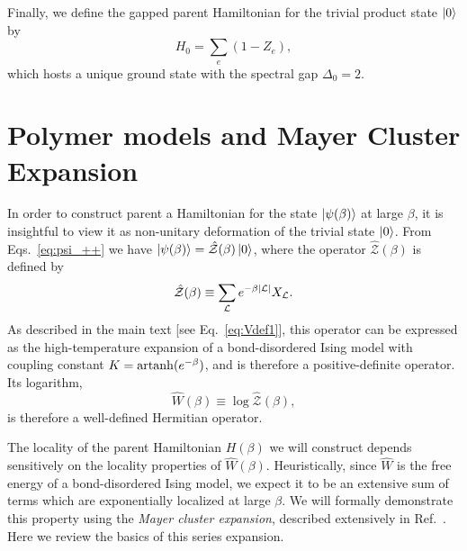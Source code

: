 Finally, we define the gapped parent Hamiltonian for the trivial product state $\ket{0}$ by
\begin{equation}
    H_0 = \sum_e (1 - Z_e) ,
\end{equation}
which hosts a unique ground state with the spectral gap $\Delta_0 = 2$. 

\section{Polymer models and Mayer Cluster Expansion}
\label{sec:cluster_expansion}
In order to construct parent a Hamiltonian for the state $\ket{\psi(\beta)}$ at large $\beta$, it is insightful to view it as non-unitary deformation of the trivial state $\ket{0}$. From Eqs.~\eqref{eq:psi_++} we have $\ket{\psi(\beta)} = \hat{\mathcal{Z}}(\beta) \ket{0}$, where the operator $\hat{\mathcal{Z}}(\beta)$ is defined by
\begin{equation}
\label{eq:operator_partition_fns}
    \hat{\mathcal{Z}}(\beta) \equiv \sum_{\mathcal{L}} e^{-\beta \abs{\mathcal{L}}} X_{\mathcal{L}} .
\end{equation}
As described in the main text [see Eq.~\eqref{eq:Vdef1}], this operator can be expressed as the high-temperature expansion of a bond-disordered Ising model with coupling constant $K = \operatorname{artanh}(e^{-\beta})$, and is therefore a positive-definite operator. Its logarithm,
\begin{equation}
    \hat{W}(\beta) \equiv \log \hat{\mathcal{Z}}(\beta) ,
\end{equation}
is therefore a well-defined Hermitian operator. 

The locality of the parent Hamiltonian $H(\beta)$ we will construct depends sensitively on the locality properties of $\hat{W}(\beta)$. Heuristically, since $\hat{W}$ is the free energy of a bond-disordered Ising model, we expect it to be an extensive sum of terms which are exponentially localized at large $\beta$. We will formally demonstrate this property using the \emph{Mayer cluster expansion}, described extensively in Ref.~. Here we review the basics of this series expansion.


